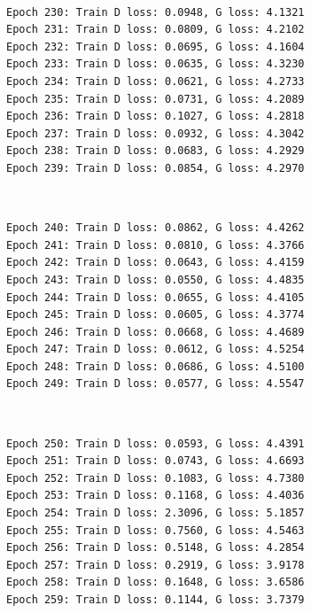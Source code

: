 \documentclass[11pt]{article}
\begin{document}
    \begin{center}
    \end{center}
    { \hspace*{\fill} \\}
    
    \begin{Verbatim}[commandchars=\\\{\}]
Epoch 230: Train D loss: 0.0948, G loss: 4.1321
Epoch 231: Train D loss: 0.0809, G loss: 4.2102
Epoch 232: Train D loss: 0.0695, G loss: 4.1604
Epoch 233: Train D loss: 0.0635, G loss: 4.3230
Epoch 234: Train D loss: 0.0621, G loss: 4.2733
Epoch 235: Train D loss: 0.0731, G loss: 4.2089
Epoch 236: Train D loss: 0.1027, G loss: 4.2818
Epoch 237: Train D loss: 0.0932, G loss: 4.3042
Epoch 238: Train D loss: 0.0683, G loss: 4.2929
Epoch 239: Train D loss: 0.0854, G loss: 4.2970

    \end{Verbatim}

    \begin{center}
    \end{center}
    { \hspace*{\fill} \\}
    
    \begin{Verbatim}[commandchars=\\\{\}]
Epoch 240: Train D loss: 0.0862, G loss: 4.4262
Epoch 241: Train D loss: 0.0810, G loss: 4.3766
Epoch 242: Train D loss: 0.0643, G loss: 4.4159
Epoch 243: Train D loss: 0.0550, G loss: 4.4835
Epoch 244: Train D loss: 0.0655, G loss: 4.4105
Epoch 245: Train D loss: 0.0605, G loss: 4.3774
Epoch 246: Train D loss: 0.0668, G loss: 4.4689
Epoch 247: Train D loss: 0.0612, G loss: 4.5254
Epoch 248: Train D loss: 0.0686, G loss: 4.5100
Epoch 249: Train D loss: 0.0577, G loss: 4.5547

    \end{Verbatim}

    \begin{center}
    \end{center}
    { \hspace*{\fill} \\}
    
    \begin{Verbatim}[commandchars=\\\{\}]
Epoch 250: Train D loss: 0.0593, G loss: 4.4391
Epoch 251: Train D loss: 0.0743, G loss: 4.6693
Epoch 252: Train D loss: 0.1083, G loss: 4.7380
Epoch 253: Train D loss: 0.1168, G loss: 4.4036
Epoch 254: Train D loss: 2.3096, G loss: 5.1857
Epoch 255: Train D loss: 0.7560, G loss: 4.5463
Epoch 256: Train D loss: 0.5148, G loss: 4.2854
Epoch 257: Train D loss: 0.2919, G loss: 3.9178
Epoch 258: Train D loss: 0.1648, G loss: 3.6586
Epoch 259: Train D loss: 0.1144, G loss: 3.7379

    \end{Verbatim}
\end{document}
